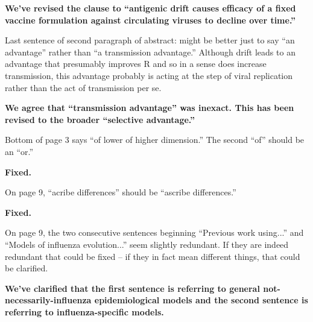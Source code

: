 \documentclass[11pt,oneside,letterpaper]{article}
\begin{document}
\textbf{We've revised the clause to ``antigenic drift causes efficacy of a fixed vaccine formulation against circulating viruses to decline over time.''}

Last sentence of second paragraph of abstract: might be better just to say ``an advantage'' rather than ``a transmission advantage.'' Although drift leads to an advantage that presumably improves R and so in a sense does increase transmission, this advantage probably is acting at the step of viral replication rather than the act of transmission per se. 

\textbf{We agree that ``transmission advantage'' was inexact.  This has been revised to the broader ``selective advantage.''}

Bottom of page 3 says ``of lower of higher dimension.'' The second ``of'' should be an ``or.'' 

\textbf{Fixed.}

On page 9, ``acribe differences'' should be ``ascribe differences.''

\textbf{Fixed.}

On page 9, the two consecutive sentences beginning ``Previous work using...'' and ``Models of influenza evolution...'' seem slightly redundant. If they are indeed redundant that could be fixed -- if they in fact mean different things, that could be clarified. 

\textbf{We've clarified that the first sentence is referring to general not-necessarily-influenza epidemiological models and the second sentence is referring to influenza-specific models.}
\end{document}
